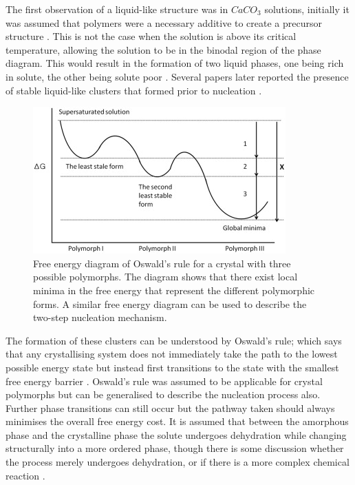 The first observation of a liquid-like structure was in 
$CaCO_3$ solutions, initially it was assumed that polymers
were a necessary additive to create a precursor structure 
\cite{Driessche2017, Karthika2016}. This is not the case when 
the solution is above its critical temperature, allowing the 
solution to be in the binodal region of the phase diagram. 
This would result in the formation of two liquid phases, 
one being rich in solute, the other being solute poor 
\cite{Karthika2016, Fu2021}. Several papers later reported 
the presence of stable liquid-like clusters that formed 
prior to nucleation \cite{Savage2009, Wolde1997, Soga1999}. 

\begin{figure}
	\centering
	\includegraphics[width=\linewidth]{oswalds_rule.jpg}
	\caption{Free energy diagram of Oswald's rule for a 
	crystal with three possible polymorphs. The diagram 
	shows that there exist local minima in the free energy 
	that represent the different polymorphic forms. A similar
	free energy diagram can be used to describe the two-step
	nucleation mechanism.}
\end{figure}

The formation of these clusters can be understood by Oswald's 
rule; which says that any crystallising system does not 
immediately take the path to the lowest possible energy state 
but instead first transitions to the state with the smallest 
free energy barrier \cite{Ostwald1897}. Oswald's rule was 
assumed to be applicable for crystal polymorphs but can be
generalised to describe the nucleation process also. Further phase 
transitions can still occur but the pathway taken should 
always minimises the overall free energy cost. It is assumed
that between the amorphous phase and the crystalline phase 
the solute undergoes dehydration while changing structurally 
into a more ordered phase, though there is some discussion 
whether the process merely undergoes dehydration, or if there 
is a more complex chemical reaction
\cite{Karthika2016}.

